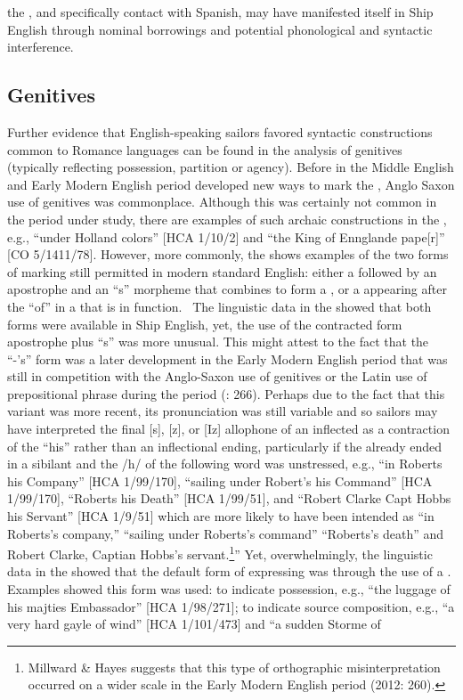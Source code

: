 the , and specifically contact with Spanish, may have manifested itself in Ship English through nominal borrowings and potential phonological and syntactic interference. ~

\subsection{{Genitives}}\label{sec:5.2.2}

Further evidence that English-speaking sailors favored syntactic constructions common to Romance languages can be found in the analysis of genitives (typically reflecting possession, partition or agency). Before  in the Middle English and Early Modern English period developed new ways to mark the , Anglo Saxon use of  genitives was commonplace. Although this was certainly not common in the period under study, there are examples of such archaic constructions in the , e.g., “under Holland colors” [HCA 1/10/2] and “the King of Ennglande pape[r]” [CO 5/1411/78]. However, more commonly, the  shows examples of the two forms of  marking still permitted in modern standard English: either a  followed by an apostrophe and an “s” morpheme that combines to form a  , or a  appearing after the  “of” in a  that is  in function. ~The linguistic data in the  showed that both forms were available in Ship English, yet, the use of the contracted form apostrophe plus “s” was more unusual. This might attest to the fact that the “-’s”  form was a later development in the Early Modern English period that was still in competition with the Anglo-Saxon use of  genitives or the Latin use of prepositional  phrase during the period (\citealt{Milward1996}: 266). Perhaps due to the fact that this variant was more recent, its pronunciation was still variable and so sailors may have interpreted the final [s], [z], or [Iz] allophone of an inflected   as a contraction of the   “his” rather than an inflectional ending, particularly if the  already ended in a sibilant and the /h/ of the following word was unstressed, e.g., “in Roberts his Company” [HCA 1/99/170], “sailing under Robert’s his Command” [HCA 1/99/170], “Roberts his Death” [HCA 1/99/51], and “Robert Clarke Capt Hobbs his Servant” [HCA 1/9/51] which are more likely to have been intended as “in Roberts’s company,” “sailing under Roberts’s command” “Roberts’s death” and Robert Clarke, Captian Hobbs’s servant.\footnote{Millward \& Hayes suggests that this type of orthographic misinterpretation occurred on a wider scale in the Early Modern English period (2012: 260).}” Yet, overwhelmingly, the linguistic data in the  showed that the default form of expressing  was through the use of a . Examples showed this form was used: to indicate possession, e.g., “the luggage of his majties Embassador” [HCA 1/98/271]; to indicate source composition, e.g., “a very hard gayle of wind” [HCA 1/101/473] and “a sudden Storme of 